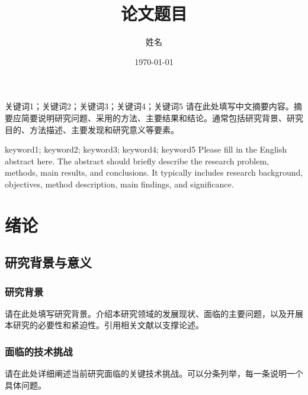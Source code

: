 \documentclass[supercite]{HustGraduPaper}
\title{论文题目}
\author{姓名}
\date{\today}
\begin{document}
	\maketitle
	
	\statement
	
	\clearpage
	
	\begin{cnabstract}{关键词1；关键词2；关键词3；关键词4；关键词5}
		请在此处填写中文摘要内容。摘要应简要说明研究问题、采用的方法、主要结果和结论。通常包括研究背景、研究目的、方法描述、主要发现和研究意义等要素。
	\end{cnabstract}
	
	\begin{enabstract}{keyword1; keyword2; keyword3; keyword4; keyword5}
		Please fill in the English abstract here. The abstract should briefly describe the research problem, methods, main results, and conclusions. It typically includes research background, objectives, method description, main findings, and significance.
	\end{enabstract}
	
	\tableofcontents
	
	\clearpage
	
	\section{绪论}
	
	\subsection{研究背景与意义}
	
	\subsubsection{研究背景}
	
	请在此处填写研究背景。介绍本研究领域的发展现状、面临的主要问题，以及开展本研究的必要性和紧迫性。引用相关文献以支撑论述。
	
	\subsubsection{面临的技术挑战}
	
	请在此处详细阐述当前研究面临的关键技术挑战。可以分条列举，每一条说明一个具体问题。
	
\end{document}
